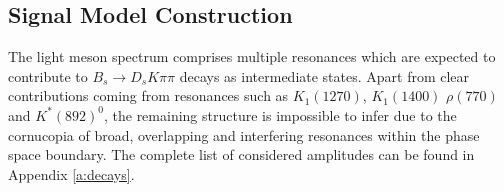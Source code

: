 
\subsection{Signal Model Construction}
\label{sec:LASSO}

The light meson spectrum comprises multiple resonances which are expected to contribute to $B_s \to D_s K \pi \pi$  decays as intermediate states. 
Apart from clear contributions coming from resonances such as $K_{1}(1270)$, $K_{1}(1400)$ $\rho(770)$ and $K^*(892)^0$, 
the remaining structure is impossible to infer due to
the cornucopia of broad, overlapping and interfering resonances 
within the phase space boundary.
The complete list of considered amplitudes can be found in Appendix \ref{a:decays}.

